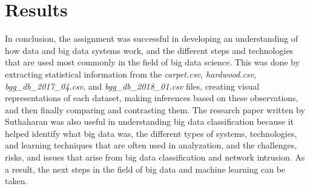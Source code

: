 \documentclass[a4paper,12pt]{IEEEtran}
\begin{document}
\section{Results}
In conclusion, the assignment was successful in developing an understanding of how data and big data systems work, and the different steps and technologies that are used most commonly in the field of big data science. This was done by extracting statistical information from the \textit{carpet.csv, hardwood.csv, bgg\_db\_2017\_04.csv}, and \textit{bgg\_db\_2018\_01.csv} files, creating visual representations of each dataset, making inferences based on these observations, and then finally comparing and contrasting them. The research paper written by Suthaharan was also useful in understanding big data classification because it helped identify what big data was, the different types of systems, technologies, and learning techniques that are often used in analyzation, and the challenges, risks, and issues that arise from big data classification and network intrusion. As a result, the next steps in the field of big data and machine learning can be taken.
\end{document}
